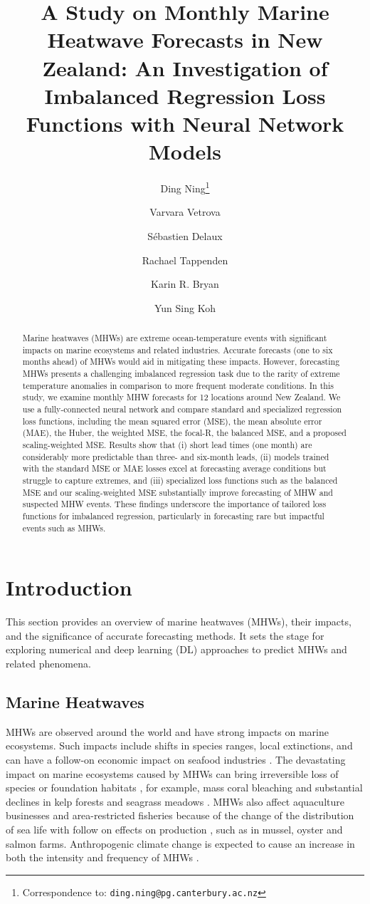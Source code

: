 \documentclass[11pt, a4paper]{article}
\title{A Study on Monthly Marine Heatwave Forecasts in New Zealand: An Investigation of Imbalanced Regression Loss Functions with Neural Network Models}
\author[1]{Ding Ning\thanks{Correspondence to: \texttt{ding.ning@pg.canterbury.ac.nz}}}
\author[1]{Varvara Vetrova}
\author[2]{S\'ebastien Delaux}
\author[1]{Rachael Tappenden}
\author[3]{Karin R. Bryan}
\author[4]{Yun Sing Koh}
\date{}
\affil[1]{School of Mathematics and Statistics, University of Canterbury}
\affil[2]{Oceanum}
\affil[3]{School of Environment, University of Auckland}
\affil[4]{School of Computer Science, University of Auckland}
\begin{document}
\maketitle

\begin{abstract}
Marine heatwaves (MHWs) are extreme ocean-temperature events with significant impacts on marine ecosystems and related industries. Accurate forecasts (one to six months ahead) of MHWs would aid in mitigating these impacts. However, forecasting MHWs presents a challenging imbalanced regression task due to the rarity of extreme temperature anomalies in comparison to more frequent moderate conditions. In this study, we examine monthly MHW forecasts for 12 locations around New Zealand. We use a fully-connected neural network and compare standard and specialized regression loss functions, including the mean squared error (MSE), the mean absolute error (MAE), the Huber, the weighted MSE, the focal-R, the balanced MSE, and a proposed scaling-weighted MSE. Results show that (i) short lead times (one month) are considerably more predictable than three- and six-month leads, (ii) models trained with the standard MSE or MAE losses excel at forecasting average conditions but struggle to capture extremes, and (iii) specialized loss functions such as the balanced MSE and our scaling-weighted MSE substantially improve forecasting of MHW and suspected MHW events. These findings underscore the importance of tailored loss functions for imbalanced regression, particularly in forecasting rare but impactful events such as MHWs.
\end{abstract}

\section{Introduction}

This section provides an overview of marine heatwaves (MHWs), their impacts, and the significance of accurate forecasting methods. It sets the stage for exploring numerical and deep learning (DL) approaches to predict MHWs and related phenomena.

\subsection{Marine Heatwaves}\label{subsec:mhw}

MHWs are observed around the world and have strong impacts on marine ecosystems. Such impacts include shifts in species ranges, local extinctions, and can have a follow-on economic impact on seafood industries \citep{hobday2016hierarchical}. The devastating impact on marine ecosystems caused by MHWs can bring irreversible loss of species or foundation habitats \citep{oliver2019projected}, for example, mass coral bleaching and substantial declines in kelp forests and seagrass meadows \citep{holbrook2020keeping}. MHWs also affect aquaculture businesses and area-restricted fisheries because of the change of the distribution of sea life with follow on effects on production \citep{hobday2018framework}, such as in mussel, oyster and salmon farms. Anthropogenic climate change is expected to cause an increase in both the intensity and frequency of MHWs \citep{hobday2016hierarchical}.
\end{document}
